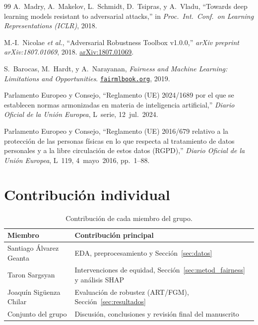 \documentclass[11pt,a4paper]{article}
\begin{document}
\begin{thebibliography}{99}
A.~Madry, A.~Makelov, L.~Schmidt, D.~Tsipras, y A.~Vladu,
``Towards deep learning models resistant to adversarial attacks,''
in \textit{Proc.\ Int.\ Conf.\ on Learning Representations (ICLR)}, 2018.

M.-I.~Nicolae \textit{et al.},
``Adversarial Robustness Toolbox v1.0.0,''
\textit{arXiv preprint arXiv:1807.01069}, 2018.
\href{https://arxiv.org/abs/1807.01069}{arXiv:1807.01069}.

S.~Barocas, M.~Hardt, y A.~Narayanan,
\textit{Fairness and Machine Learning: Limitations and Opportunities}.
\href{https://fairmlbook.org}{\texttt{fairmlbook.org}}, 2019.

Parlamento Europeo y Consejo,
``Reglamento (UE) 2024/1689 por el que se establecen normas armonizadas en materia de inteligencia artificial,''
\textit{Diario Oficial de la Unión Europea}, L~serie, 12~jul.~2024.

Parlamento Europeo y Consejo,
``Reglamento (UE) 2016/679 relativo a la protección de las personas físicas en lo que respecta al tratamiento de datos personales y a la libre circulación de estos datos (RGPD),''
\textit{Diario Oficial de la Unión Europea}, L~119, 4~mayo~2016, pp.~1--88.

\end{thebibliography}



\appendix

\section{Contribución individual}

\begin{table}[H]
\centering
\caption{Contribución de cada miembro del grupo.}
\small
\begin{tabular}{ll}
\toprule
\textbf{Miembro} & \textbf{Contribución principal} \\
\midrule
Santiago Álvarez Geanta   & EDA, preprocesamiento y Sección~\ref{sec:datos} \\
Taron Sargsyan            & Intervenciones de equidad, Sección~\ref{sec:metod_fairness} y análisis SHAP \\
Joaquín Sigüenza Chilar   & Evaluación de robustez (ART/FGM), Sección~\ref{sec:resultados} \\
\midrule
Conjunto del grupo & Discusión, conclusiones y revisión final del manuscrito \\
\bottomrule
\end{tabular}
\end{table}
\end{document}
